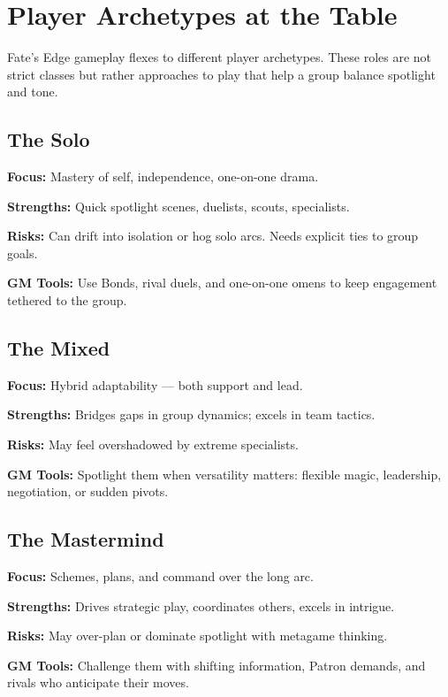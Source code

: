 
\section{Player Archetypes at the Table}

Fate's Edge gameplay flexes to different player archetypes. These roles are not strict classes but rather approaches to play that help a group balance spotlight and tone.

\subsection{The Solo}

\textbf{Focus:} Mastery of self, independence, one-on-one drama.

\textbf{Strengths:} Quick spotlight scenes, duelists, scouts, specialists.

\textbf{Risks:} Can drift into isolation or hog solo arcs. Needs explicit ties to group goals.

\textbf{GM Tools:} Use Bonds, rival duels, and one-on-one omens to keep engagement tethered to the group.

\subsection{The Mixed}

\textbf{Focus:} Hybrid adaptability --- both support and lead.

\textbf{Strengths:} Bridges gaps in group dynamics; excels in team tactics.

\textbf{Risks:} May feel overshadowed by extreme specialists.

\textbf{GM Tools:} Spotlight them when versatility matters: flexible magic, leadership, negotiation, or sudden pivots.

\subsection{The Mastermind}

\textbf{Focus:} Schemes, plans, and command over the long arc.

\textbf{Strengths:} Drives strategic play, coordinates others, excels in intrigue.

\textbf{Risks:} May over-plan or dominate spotlight with metagame thinking.

\textbf{GM Tools:} Challenge them with shifting information, Patron demands, and rivals who anticipate their moves.


